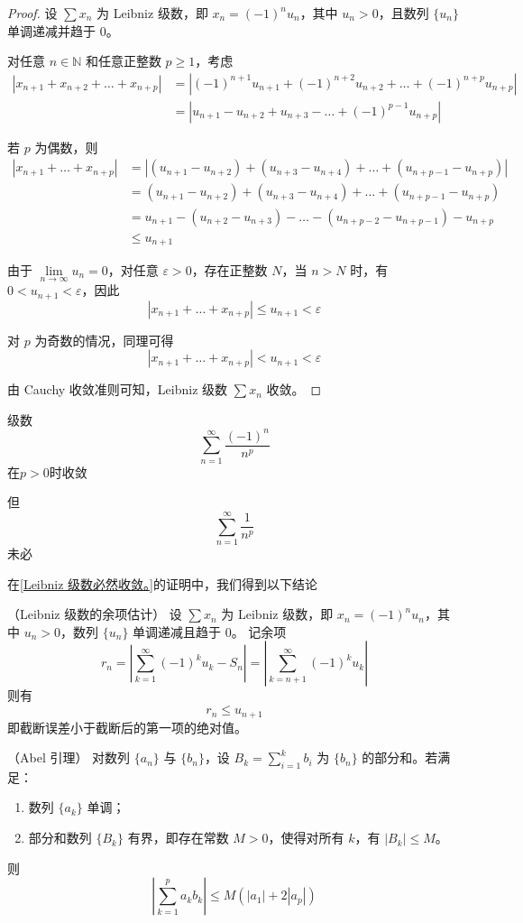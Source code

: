 \begin{proof}
	设 $\sum x_n$ 为 Leibniz 级数，即 $x_n = (-1)^n u_n$，其中 $u_n > 0$，且数列 $\{u_n\}$ 单调递减并趋于 $0$。
	
	对任意 $n \in \mathbb{N}$ 和任意正整数 $p \ge 1$，考虑
	\[
	\begin{aligned}
		|x_{n+1} + x_{n+2} + \dots + x_{n+p}|
		&= |(-1)^{n+1} u_{n+1} + (-1)^{n+2} u_{n+2} + \dots + (-1)^{n+p} u_{n+p}| \\
		&= |u_{n+1} - u_{n+2} + u_{n+3} - \dots + (-1)^{p-1} u_{n+p}|
	\end{aligned}
	\]
	
	若 $p$ 为偶数，则
	\[
	\begin{aligned}
		|x_{n+1} + \dots + x_{n+p}|
		&= |(u_{n+1} - u_{n+2}) + (u_{n+3} - u_{n+4}) + \dots + (u_{n+p-1} - u_{n+p})| \\
		&= (u_{n+1} - u_{n+2}) + (u_{n+3} - u_{n+4}) + \dots + (u_{n+p-1} - u_{n+p}) \\
		&= u_{n+1} - (u_{n+2} - u_{n+3}) - \dots - (u_{n+p-2} - u_{n+p-1}) - u_{n+p} \\
		&\le u_{n+1}
	\end{aligned}
	\]
	
	由于 $\lim\limits_{n \to \infty} u_n = 0$，对任意 $\varepsilon > 0$，存在正整数 $N$，当 $n > N$ 时，有 $0 < u_{n+1} < \varepsilon$，因此
	\[
	|x_{n+1} + \dots + x_{n+p}| \le u_{n+1} < \varepsilon
	\]
	
	对 $p$ 为奇数的情况，同理可得
	\[
	|x_{n+1} + \dots + x_{n+p}| < u_{n+1} < \varepsilon
	\]
	
	由 Cauchy 收敛准则可知，Leibniz 级数 $\sum x_n$ 收敛。
	
\end{proof}
\begin{example}
	级数
	\[\sum_{n=1}^\infty\frac{(-1)^n}{n^p}\]
	在$p>0$时收敛
	
	但
	\[\sum_{n=1}^\infty\frac{1}{n^p}\]未必
\end{example}
在\ref{Leibniz 级数必然收敛。}的证明中，我们得到以下结论
\begin{proposition}
	（Leibniz 级数的余项估计）
	设 $\sum x_n$ 为 Leibniz 级数，即 $x_n = (-1)^n u_n$，其中 $u_n > 0$，数列 $\{u_n\}$ 单调递减且趋于 $0$。
	记余项
	\[
	r_n = \left| \sum_{k=1}^{\infty} (-1)^k u_k - S_n \right| = \left| \sum_{k=n+1}^{\infty} (-1)^k u_k \right|
	\]
	则有
	\[
	r_n \le u_{n+1}
	\]
	即截断误差小于截断后的第一项的绝对值。
\end{proposition}
\begin{lemma}
	（Abel 引理）
	对数列 $\{a_n\}$ 与 $\{b_n\}$，设 $B_k = \sum_{i=1}^k b_i$ 为 $\{b_n\}$ 的部分和。若满足：
	\begin{enumerate}
		\item 数列 $\{a_k\}$ 单调； 
		\item 部分和数列 $\{B_k\}$ 有界，即存在常数 $M > 0$，使得对所有 $k$，有 $|B_k| \le M$。
	\end{enumerate}

	则
	\[
	\left| \sum_{k=1}^p a_k b_k \right| \le M \left( |a_1| + 2|a_p| \right)
	\]
\end{lemma}
